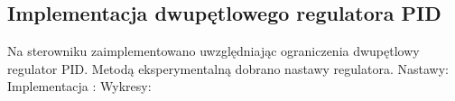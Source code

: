 \subsection{Implementacja dwupętlowego regulatora PID}
\label{lab:zad3}


%    

Na	sterowniku	zaimplementowano	uwzględniając	ograniczenia	dwupętlowy	
regulator	PID. Metodą	eksperymentalną	 dobrano	nastawy	regulatora.
Nastawy:
Implementacja :
Wykresy: 

\newpage
